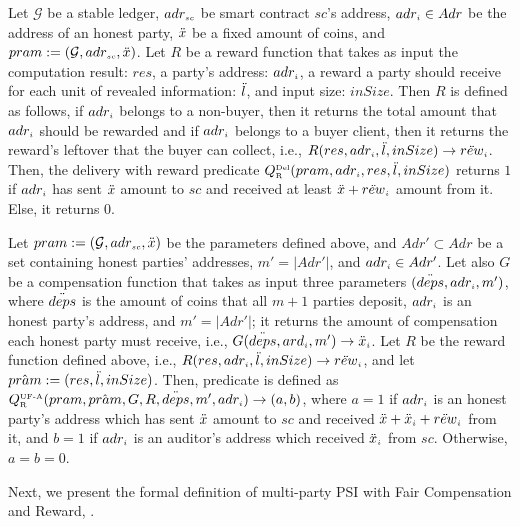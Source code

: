     \begin{definition}   Let $\mathcal{G}$ be a stable ledger, $adr_{\scriptscriptstyle sc}$ be smart contract $sc$'s address, $adr_{\scriptscriptstyle i}\in Adr$ be the address of an honest party, $\ddot{x}$ be a fixed amount of coins, and $pram:=(\mathcal{G}, adr_{\scriptscriptstyle sc}, \ddot{x})$. Let $R$ be a reward function that takes as input the computation result: $res$, a party's address: $adr_{\scriptscriptstyle i}$, a reward a party should receive for each unit of revealed information:  $\ddot{l}$, and input size: $inSize$.  Then $R$ is defined as follows, if $adr_{\scriptscriptstyle i}$ belongs to a non-buyer, then it returns the total amount that $adr_{\scriptscriptstyle i}$ should be rewarded and if $adr_{\scriptscriptstyle i}$ belongs to a buyer client, then it returns the reward's leftover that the buyer can collect, i.e., $R(res, adr_{\scriptscriptstyle i}, \ddot{l}, inSize)\rightarrow \ddot{rew}_{\scriptscriptstyle i}$.    Then, the delivery with reward predicate $Q^{\scriptscriptstyle \text{Del}}_{\scriptscriptstyle\text{R}}(pram,  adr_{\scriptscriptstyle i}, res, \ddot{l}, inSize)$ returns $1$ if $adr_{\scriptscriptstyle i}$ has sent $\ddot{x}$ amount to $sc$ and received at least $\ddot{x}+\ddot{rew}_{\scriptscriptstyle i}$ amount from it. Else, it returns $0$. 
%
  \end{definition}


\vs


   \begin{definition}  
 Let $pram:=(\mathcal{G}, adr_{\scriptscriptstyle sc}, \ddot{x})$ be the parameters defined above, and $Adr'\subset Adr$ be a set containing honest parties' addresses, $m' = |Adr'|$,  and   $adr_{\scriptscriptstyle i}\in Adr'$. Let also $G$ be a compensation function that takes as input  three parameters $(\ddot{deps}, adr_{\scriptscriptstyle i}, m')$, where $\ddot{deps}$ is the amount of coins that all $m+1$ parties deposit, $adr_{\scriptscriptstyle i}$ is an honest party's address, and $m' = |Adr'|$; it returns the amount of compensation each honest party must receive, i.e., $G(\ddot{deps}, ard_{\scriptscriptstyle i}, m')\rightarrow \ddot{x}_{\scriptscriptstyle i}$. Let $R$ be the reward function defined above, i.e., $R(res, adr_{\scriptscriptstyle i}, \ddot{l}, inSize)\rightarrow \ddot{rew}_{\scriptscriptstyle i}$, and let $\hat {pram}:=(res, \ddot{l}, inSize)$.  Then, predicate \qUnFAbtwr is defined as $Q^{\scriptscriptstyle \text{UF-A}}_{\scriptscriptstyle \text{R}}(pram, \hat {pram}, G, R, \ddot{deps}, m', adr_{\scriptscriptstyle i})\rightarrow (a,b)$, where $a=1$ if $adr_{\scriptscriptstyle i}$ is an honest party's address which has sent $\ddot{x}$ amount to $sc$ and received  $\ddot{x}+\ddot{x}_{\scriptscriptstyle i}+\ddot{rew}_{\scriptscriptstyle i}$  from it, and $b=1$ if $adr_{\scriptscriptstyle i}$ is an auditor's address which received $\ddot{x}_{\scriptscriptstyle i}$  from $sc$. Otherwise, $a=b=0$. 
  \end{definition}

 
Next, we present the formal definition of multi-party PSI with Fair Compensation and Reward, \ep. 


